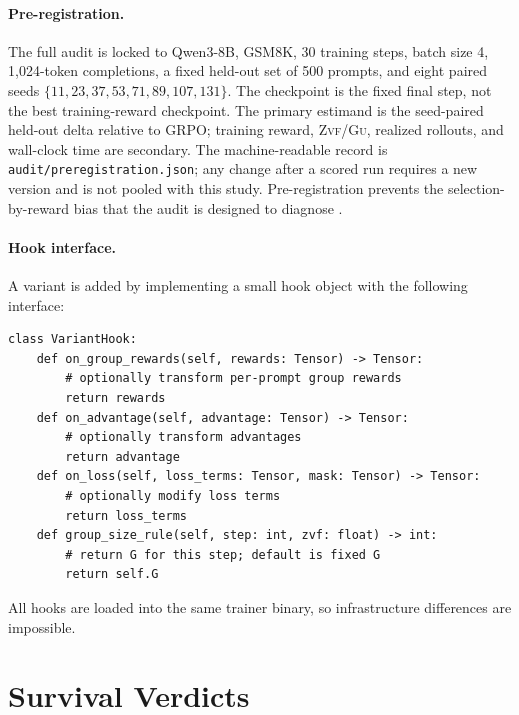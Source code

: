 \documentclass[11pt]{article}
\newcommand{\zvf}{\textsc{Zvf}}
\newcommand{\gu}{\textsc{Gu}}
\begin{document}
\paragraph{Pre-registration.} The full audit is locked to Qwen3-8B, GSM8K,
30 training steps, batch size 4, 1,024-token completions, a fixed held-out set
of 500 prompts, and eight paired seeds
$\{11,23,37,53,71,89,107,131\}$. The checkpoint is the fixed final step, not
the best training-reward checkpoint. The primary estimand is the seed-paired
held-out delta relative to GRPO; training reward, \zvf/\gu{}, realized rollouts,
and wall-clock time are secondary. The machine-readable record is
\texttt{audit/preregistration.json}; any change after a scored run requires a
new version and is not pooled with this study. Pre-registration prevents the
selection-by-reward bias that the audit is designed to diagnose
\cite{zvfaudit2026}.

\paragraph{Hook interface.} A variant is added by implementing a small hook
object with the following interface:
\begin{verbatim}
class VariantHook:
    def on_group_rewards(self, rewards: Tensor) -> Tensor:
        # optionally transform per-prompt group rewards
        return rewards
    def on_advantage(self, advantage: Tensor) -> Tensor:
        # optionally transform advantages
        return advantage
    def on_loss(self, loss_terms: Tensor, mask: Tensor) -> Tensor:
        # optionally modify loss terms
        return loss_terms
    def group_size_rule(self, step: int, zvf: float) -> int:
        # return G for this step; default is fixed G
        return self.G
\end{verbatim}
All hooks are loaded into the same trainer binary, so infrastructure differences
are impossible.

\section{Survival Verdicts}
\label{sec:verdict}
\end{document}
